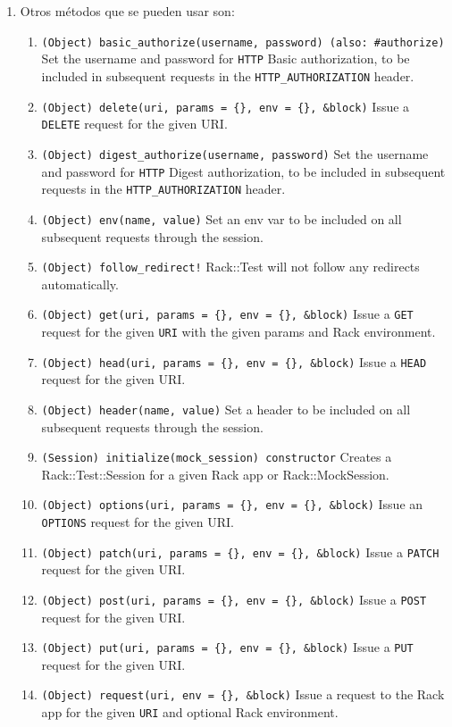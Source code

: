 \begin{enumerate}
\item 
Otros métodos que se pueden usar son:
\begin{enumerate}
\item \verb|(Object) basic_authorize(username, password) (also: #authorize)|
Set the username and password for \verb|HTTP| Basic authorization, to be included in subsequent requests in the \verb|HTTP_AUTHORIZATION| header.
\item \verb|(Object) delete(uri, params = {}, env = {}, &block)|
Issue a \verb|DELETE| request for the given URI.
\item \verb|(Object) digest_authorize(username, password)|
Set the username and password for \verb|HTTP| Digest authorization, to be included in subsequent requests in the \verb|HTTP_AUTHORIZATION| header.
\item \verb|(Object) env(name, value)|
Set an env var to be included on all subsequent requests through the session.
\item \verb|(Object) follow_redirect!|
Rack::Test will not follow any redirects automatically.
\item \verb|(Object) get(uri, params = {}, env = {}, &block)|
Issue a \verb|GET| request for the given \verb|URI| with the given params and Rack environment.
\item \verb|(Object) head(uri, params = {}, env = {}, &block)|
Issue a \verb|HEAD| request for the given URI.
\item \verb|(Object) header(name, value)|
Set a header to be included on all subsequent requests through the session.
\item \verb|(Session) initialize(mock_session) constructor|
Creates a Rack::Test::Session for a given Rack app or Rack::MockSession.
\item \verb|(Object) options(uri, params = {}, env = {}, &block)|
Issue an \verb|OPTIONS| request for the given URI.
\item \verb|(Object) patch(uri, params = {}, env = {}, &block)|
Issue a \verb|PATCH| request for the given URI.
\item \verb|(Object) post(uri, params = {}, env = {}, &block)|
Issue a \verb|POST| request for the given URI.
\item \verb|(Object) put(uri, params = {}, env = {}, &block)|
Issue a \verb|PUT| request for the given URI.
\item \verb|(Object) request(uri, env = {}, &block)|
Issue a request to the Rack app for the given \verb|URI| and optional Rack environment.
\end{enumerate}


\end{enumerate}
